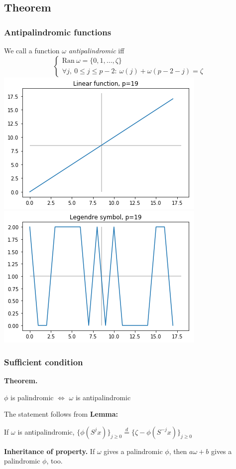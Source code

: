 \subsection{Theorem}
\begin{frame}
\frametitle{Antipalindromic functions}
We call a function $\omega$  \textit{antipalindromic} iff
\[\begin{cases}
	\mathrm{Ran }\ \omega = \{0,1, \ldots, \zeta\} \\
	\forall j,\ 0 \le j \le p-2: \  \omega(j) + \omega(p-2-j) = \zeta
\end{cases}\]
\includegraphics[width=0.5\linewidth]{linear}\includegraphics[width=0.5\linewidth]{legendre}
\end{frame}

\begin{frame}
\frametitle{Sufficient condition}
\textbf{Theorem.}
\begin{center}$\phi$ is palindromic $\iff$ $\omega$ is antipalindromic \end{center}
 
The statement follows from \textbf{Lemma:}
\begin{center}If $\omega$ is antipalindromic, $\{\phi(S^j x)\}_{j \ge 0} \overset{d}{=} \{ \zeta - \phi(S^{-j} x)\}_{j \ge 0}$\end{center}
\textbf{Inheritance of property.}
If $\omega$ gives a palindromic $\phi$, then $a\omega+b$ gives a palindromic $\phi$, too.
\end{frame}

